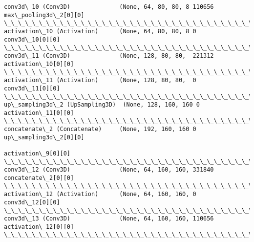 \documentclass[11pt]{article}
\begin{document}
\begin{Verbatim}[commandchars=\\\{\}]
conv3d\_10 (Conv3D)              (None, 64, 80, 80, 8 110656      max\_pooling3d\_2[0][0]            
\_\_\_\_\_\_\_\_\_\_\_\_\_\_\_\_\_\_\_\_\_\_\_\_\_\_\_\_\_\_\_\_\_\_\_\_\_\_\_\_\_\_\_\_\_\_\_\_\_\_\_\_\_\_\_\_\_\_\_\_\_\_\_\_\_\_\_\_\_\_\_\_\_\_\_\_\_\_\_\_\_\_\_\_\_\_\_\_\_\_\_\_\_\_\_\_\_\_
activation\_10 (Activation)      (None, 64, 80, 80, 8 0           conv3d\_10[0][0]                  
\_\_\_\_\_\_\_\_\_\_\_\_\_\_\_\_\_\_\_\_\_\_\_\_\_\_\_\_\_\_\_\_\_\_\_\_\_\_\_\_\_\_\_\_\_\_\_\_\_\_\_\_\_\_\_\_\_\_\_\_\_\_\_\_\_\_\_\_\_\_\_\_\_\_\_\_\_\_\_\_\_\_\_\_\_\_\_\_\_\_\_\_\_\_\_\_\_\_
conv3d\_11 (Conv3D)              (None, 128, 80, 80,  221312      activation\_10[0][0]              
\_\_\_\_\_\_\_\_\_\_\_\_\_\_\_\_\_\_\_\_\_\_\_\_\_\_\_\_\_\_\_\_\_\_\_\_\_\_\_\_\_\_\_\_\_\_\_\_\_\_\_\_\_\_\_\_\_\_\_\_\_\_\_\_\_\_\_\_\_\_\_\_\_\_\_\_\_\_\_\_\_\_\_\_\_\_\_\_\_\_\_\_\_\_\_\_\_\_
activation\_11 (Activation)      (None, 128, 80, 80,  0           conv3d\_11[0][0]                  
\_\_\_\_\_\_\_\_\_\_\_\_\_\_\_\_\_\_\_\_\_\_\_\_\_\_\_\_\_\_\_\_\_\_\_\_\_\_\_\_\_\_\_\_\_\_\_\_\_\_\_\_\_\_\_\_\_\_\_\_\_\_\_\_\_\_\_\_\_\_\_\_\_\_\_\_\_\_\_\_\_\_\_\_\_\_\_\_\_\_\_\_\_\_\_\_\_\_
up\_sampling3d\_2 (UpSampling3D)  (None, 128, 160, 160 0           activation\_11[0][0]              
\_\_\_\_\_\_\_\_\_\_\_\_\_\_\_\_\_\_\_\_\_\_\_\_\_\_\_\_\_\_\_\_\_\_\_\_\_\_\_\_\_\_\_\_\_\_\_\_\_\_\_\_\_\_\_\_\_\_\_\_\_\_\_\_\_\_\_\_\_\_\_\_\_\_\_\_\_\_\_\_\_\_\_\_\_\_\_\_\_\_\_\_\_\_\_\_\_\_
concatenate\_2 (Concatenate)     (None, 192, 160, 160 0           up\_sampling3d\_2[0][0]            
                                                                 activation\_9[0][0]               
\_\_\_\_\_\_\_\_\_\_\_\_\_\_\_\_\_\_\_\_\_\_\_\_\_\_\_\_\_\_\_\_\_\_\_\_\_\_\_\_\_\_\_\_\_\_\_\_\_\_\_\_\_\_\_\_\_\_\_\_\_\_\_\_\_\_\_\_\_\_\_\_\_\_\_\_\_\_\_\_\_\_\_\_\_\_\_\_\_\_\_\_\_\_\_\_\_\_
conv3d\_12 (Conv3D)              (None, 64, 160, 160, 331840      concatenate\_2[0][0]              
\_\_\_\_\_\_\_\_\_\_\_\_\_\_\_\_\_\_\_\_\_\_\_\_\_\_\_\_\_\_\_\_\_\_\_\_\_\_\_\_\_\_\_\_\_\_\_\_\_\_\_\_\_\_\_\_\_\_\_\_\_\_\_\_\_\_\_\_\_\_\_\_\_\_\_\_\_\_\_\_\_\_\_\_\_\_\_\_\_\_\_\_\_\_\_\_\_\_
activation\_12 (Activation)      (None, 64, 160, 160, 0           conv3d\_12[0][0]                  
\_\_\_\_\_\_\_\_\_\_\_\_\_\_\_\_\_\_\_\_\_\_\_\_\_\_\_\_\_\_\_\_\_\_\_\_\_\_\_\_\_\_\_\_\_\_\_\_\_\_\_\_\_\_\_\_\_\_\_\_\_\_\_\_\_\_\_\_\_\_\_\_\_\_\_\_\_\_\_\_\_\_\_\_\_\_\_\_\_\_\_\_\_\_\_\_\_\_
conv3d\_13 (Conv3D)              (None, 64, 160, 160, 110656      activation\_12[0][0]              
\_\_\_\_\_\_\_\_\_\_\_\_\_\_\_\_\_\_\_\_\_\_\_\_\_\_\_\_\_\_\_\_\_\_\_\_\_\_\_\_\_\_\_\_\_\_\_\_\_\_\_\_\_\_\_\_\_\_\_\_\_\_\_\_\_\_\_\_\_\_\_\_\_\_\_\_\_\_\_\_\_\_\_\_\_\_\_\_\_\_\_\_\_\_\_\_\_\_

\end{Verbatim}
\end{document}
